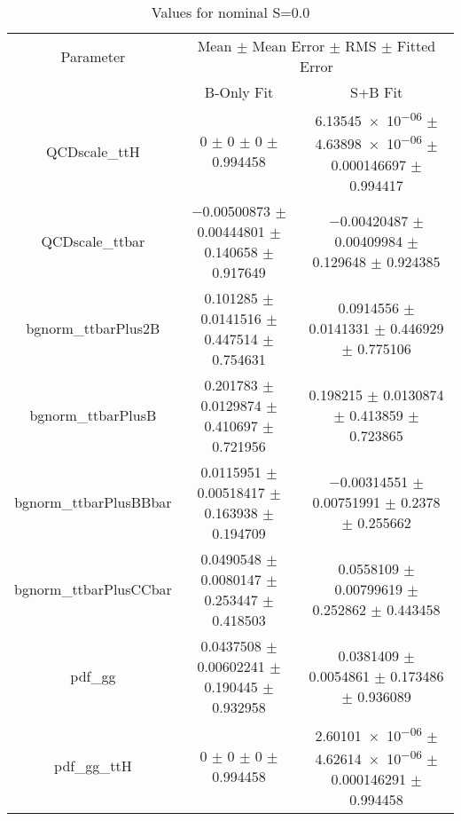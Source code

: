 \begin{table}
\centering
\caption{Values for nominal S=0.0}
\begin{tabular}{ccc}
\toprule
Parameter & \multicolumn{2}{c}{Mean $\pm$ Mean Error $\pm$ RMS $\pm$ Fitted Error}\\
 & B-Only Fit & S+B Fit\\
\midrule
QCDscale\_ttH & \num{0} $\pm$ \num{0} $\pm$ \num{0} $\pm$ \num{0.994458} & \num{6.13545e-06} $\pm$ \num{4.63898e-06} $\pm$ \num{0.000146697} $\pm$ \num{0.994417}\\
QCDscale\_ttbar & \num{-0.00500873} $\pm$ \num{0.00444801} $\pm$ \num{0.140658} $\pm$ \num{0.917649} & \num{-0.00420487} $\pm$ \num{0.00409984} $\pm$ \num{0.129648} $\pm$ \num{0.924385}\\
bgnorm\_ttbarPlus2B & \num{0.101285} $\pm$ \num{0.0141516} $\pm$ \num{0.447514} $\pm$ \num{0.754631} & \num{0.0914556} $\pm$ \num{0.0141331} $\pm$ \num{0.446929} $\pm$ \num{0.775106}\\
bgnorm\_ttbarPlusB & \num{0.201783} $\pm$ \num{0.0129874} $\pm$ \num{0.410697} $\pm$ \num{0.721956} & \num{0.198215} $\pm$ \num{0.0130874} $\pm$ \num{0.413859} $\pm$ \num{0.723865}\\
bgnorm\_ttbarPlusBBbar & \num{0.0115951} $\pm$ \num{0.00518417} $\pm$ \num{0.163938} $\pm$ \num{0.194709} & \num{-0.00314551} $\pm$ \num{0.00751991} $\pm$ \num{0.2378} $\pm$ \num{0.255662}\\
bgnorm\_ttbarPlusCCbar & \num{0.0490548} $\pm$ \num{0.0080147} $\pm$ \num{0.253447} $\pm$ \num{0.418503} & \num{0.0558109} $\pm$ \num{0.00799619} $\pm$ \num{0.252862} $\pm$ \num{0.443458}\\
pdf\_gg & \num{0.0437508} $\pm$ \num{0.00602241} $\pm$ \num{0.190445} $\pm$ \num{0.932958} & \num{0.0381409} $\pm$ \num{0.0054861} $\pm$ \num{0.173486} $\pm$ \num{0.936089}\\
pdf\_gg\_ttH & \num{0} $\pm$ \num{0} $\pm$ \num{0} $\pm$ \num{0.994458} & \num{2.60101e-06} $\pm$ \num{4.62614e-06} $\pm$ \num{0.000146291} $\pm$ \num{0.994458}\\
\bottomrule
\end{tabular}
\end{table}